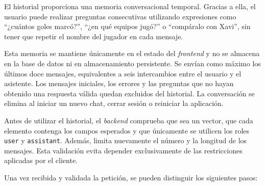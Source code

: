 El historial proporciona una memoria conversacional temporal. Gracias a ella, el usuario puede realizar preguntas consecutivas utilizando expresiones como ``¿cuántos goles marcó?'', ``¿en qué equipos jugó?'' o ``compáralo con Xavi'', sin tener que repetir el nombre del jugador en cada mensaje.

Esta memoria se mantiene únicamente en el estado del \textit{frontend} y no se almacena en la base de datos ni en almacenamiento persistente. Se envían como máximo los últimos doce mensajes, equivalentes a seis intercambios entre el usuario y el asistente. Los mensajes iniciales, los errores y las preguntas que no hayan obtenido una respuesta válida quedan excluidos del historial. La conversación se elimina al iniciar un nuevo chat, cerrar sesión o reiniciar la aplicación.

Antes de utilizar el historial, el \textit{backend} comprueba que sea un vector, que cada elemento contenga los campos esperados y que únicamente se utilicen los roles \texttt{user} y \texttt{assistant}. Además, limita nuevamente el número y la longitud de los mensajes. Esta validación evita depender exclusivamente de las restricciones aplicadas por el cliente.

Una vez recibida y validada la petición, se pueden distinguir los siguientes pasos:

